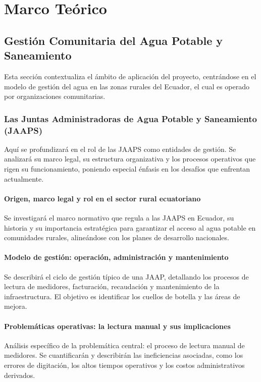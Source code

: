 \chapter{Marco Teórico}
\label{chap:marco_teorico}

\section{Gestión Comunitaria del Agua Potable y Saneamiento}
\label{sec:gestion_agua}
Esta sección contextualiza el ámbito de aplicación del proyecto, centrándose en el modelo de gestión del agua en las zonas rurales del Ecuador, el cual es operado por organizaciones comunitarias.

\subsection{Las Juntas Administradoras de Agua Potable y Saneamiento (JAAPS)}
\label{ssec:jaaps}
Aquí se profundizará en el rol de las JAAPS como entidades de gestión. Se analizará su marco legal, su estructura organizativa y los procesos operativos que rigen su funcionamiento, poniendo especial énfasis en los desafíos que enfrentan actualmente.

\subsubsection{Origen, marco legal y rol en el sector rural ecuatoriano}
\label{sssec:jaaps_origen}
Se investigará el marco normativo que regula a las JAAPS en Ecuador, su historia y su importancia estratégica para garantizar el acceso al agua potable en comunidades rurales, alineándose con los planes de desarrollo nacionales.

\subsubsection{Modelo de gestión: operación, administración y mantenimiento}
\label{sssec:jaaps_modelo}
Se describirá el ciclo de gestión típico de una JAAP, detallando los procesos de lectura de medidores, facturación, recaudación y mantenimiento de la infraestructura. El objetivo es identificar los cuellos de botella y las áreas de mejora.

\subsubsection{Problemáticas operativas: la lectura manual y sus implicaciones}
\label{sssec:jaaps_problemas}
Análisis específico de la problemática central: el proceso de lectura manual de medidores. Se cuantificarán y describirán las ineficiencias asociadas, como los errores de digitación, los altos tiempos operativos y los costos administrativos derivados.

